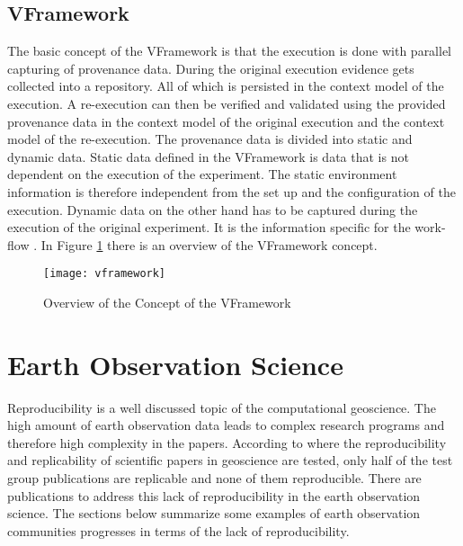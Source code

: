\documentclass[draft,final]{vutinfth} %
\begin{document}
\subsection{VFramework}

The basic concept of the VFramework is that the execution is done with parallel capturing of provenance data. During the original execution evidence gets collected into a repository. All of which is persisted in the context model of the execution. A re-execution can then be verified and validated using the provided provenance data in the context model of the original execution and the context model of the re-execution. The provenance data is divided into static and dynamic data. Static data defined in the VFramework is data that is not dependent on the execution of the experiment. The static environment information is therefore independent from the set up and the configuration of the execution. Dynamic data on the other hand has to be captured during the execution of the original experiment. It is the information specific for the work-flow \cite{Miksa2013FrameworkFV}. 
In Figure \ref{fig:vframework} there is an overview of the VFramework concept.  
\begin{figure}[h]
	\centering
	\texttt{[image: vframework]}
	\caption{Overview of the Concept of the VFramework \cite{Miksa2013FrameworkFV}}
	\label{fig:vframework} %
\end{figure}


\section{Earth Observation Science}\label{EOScience}

Reproducibility is a well discussed topic of the computational geoscience. The high amount of earth observation data leads to complex research programs and therefore high complexity in the papers.  According to \cite{Ostermann2017AdvancingSW} where the reproducibility and replicability of scientific papers in geoscience are tested, only half of the test group publications are replicable and none of them reproducible. There are publications to address this lack of reproducibility in the earth observation science. The sections below summarize some examples of earth observation communities progresses in terms of the lack of reproducibility. 
\end{document}
